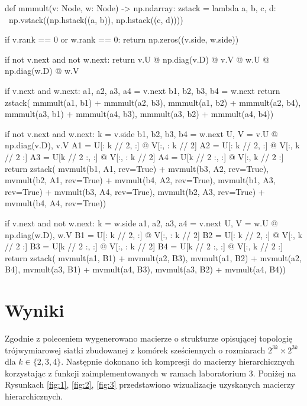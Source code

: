 \documentclass{../myclass}
\begin{document}
\newpage
\begin{python}
def mmmult(v: Node, w: Node) -> np.ndarray:
    zstack = lambda a, b, c, d: \
        np.vstack((np.hstack((a, b)), 
                   np.hstack((c, d))))

    if v.rank == 0 or w.rank == 0:
        return np.zeros((v.side, w.side))

    if not v.next and not w.next:
        return v.U @ np.diag(v.D) @ v.V @ w.U @ np.diag(w.D) @ w.V

    if v.next and w.next:
        a1, a2, a3, a4 = v.next
        b1, b2, b3, b4 = w.next
        return zstack(
            mmmult(a1, b1) + mmmult(a2, b3),
            mmmult(a1, b2) + mmmult(a2, b4),
            mmmult(a3, b1) + mmmult(a4, b3),
            mmmult(a3, b2) + mmmult(a4, b4))

    if not v.next and w.next:
        k = v.side
        b1, b2, b3, b4 = w.next
        U, V = v.U @ np.diag(v.D), v.V
        A1 = U[: k // 2, :] @ V[:, : k // 2]
        A2 = U[: k // 2, :] @ V[:, k // 2 :]
        A3 = U[k // 2 :, :] @ V[:, : k // 2]
        A4 = U[k // 2 :, :] @ V[:, k // 2 :]
        return zstack(
            mvmult(b1, A1, rev=True) + mvmult(b3, A2, rev=True),
            mvmult(b2, A1, rev=True) + mvmult(b4, A2, rev=True),
            mvmult(b1, A3, rev=True) + mvmult(b3, A4, rev=True),
            mvmult(b2, A3, rev=True) + mvmult(b4, A4, rev=True))

    if v.next and not w.next:
        k = w.side
        a1, a2, a3, a4 = v.next
        U, V = w.U @ np.diag(w.D), w.V
        B1 = U[: k // 2, :] @ V[:, : k // 2]
        B2 = U[: k // 2, :] @ V[:, k // 2 :]
        B3 = U[k // 2 :, :] @ V[:, : k // 2]
        B4 = U[k // 2 :, :] @ V[:, k // 2 :]
        return zstack(
            mvmult(a1, B1) + mvmult(a2, B3),
            mvmult(a1, B2) + mvmult(a2, B4),
            mvmult(a3, B1) + mvmult(a4, B3),
            mvmult(a3, B2) + mvmult(a4, B4))
\end{python}
\newpage
\section{Wyniki}

Zgodnie z poleceniem wygenerowano macierze o strukturze opisującej topologię trójwymiarowej siatki
zbudowanej z komórek sześciennych o rozmiarach \(2^{3k} \times 2^{3k}\) dla \(k\in\{2,3,4\}\).
Następnie dokonano ich kompresji do macierzy hierarchicznych korzystając z funkcji
zaimplementowanych w ramach laboratorium 3. Poniżej na Rysunkach \ref{fig:1}, \ref{fig:2},
\ref{fig:3} przedstawiono wizualizacje uzyskanych macierzy hierarchicznych.
\end{document}
